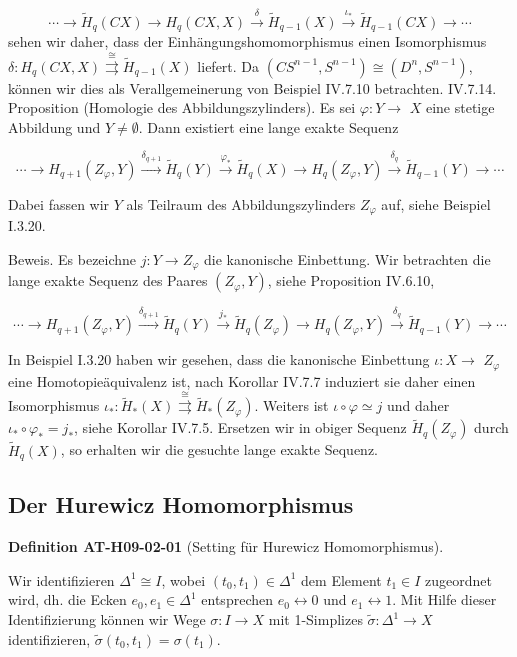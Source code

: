 \documentclass[10pt, letterpaper]{article}
\newcommand{\CustomHeading}[3]{%
  \par\medskip\noindent%
  \textbf{#1 #2} \textnormal{(#3)}.\enskip%
}
\newenvironment{DEF}[2]{\begin{unitbox}\CustomHeading{Definition}{#1}{#2}}{\end{unitbox}}
\begin{document}
$$
\cdots \rightarrow \tilde{H}_q(C X) \rightarrow H_q(C X, X) \xrightarrow{\delta} \tilde{H}_{q-1}(X) \xrightarrow{\iota_*} \tilde{H}_{q-1}(C X) \rightarrow \cdots
$$
sehen wir daher, dass der Einhängungshomomorphismus einen Isomorphismus $\delta: H_q(C X, X) \stackrel{\cong}{\rightrightarrows} \tilde{H}_{q-1}(X)$ liefert. Da $\left(C S^{n-1}, S^{n-1}\right) \cong\left(D^n, S^{n-1}\right)$, können wir dies als Verallgemeinerung von Beispiel IV.7.10 betrachten.
IV.7.14. Proposition (Homologie des Abbildungszylinders). Es sei $\varphi: Y \rightarrow$ $X$ eine stetige Abbildung und $Y \neq \emptyset$. Dann existiert eine lange exakte Sequenz

$$
\cdots \rightarrow H_{q+1}\left(Z_{\varphi}, Y\right) \xrightarrow{\delta_{q+1}} \tilde{H}_q(Y) \xrightarrow{\varphi_*} \tilde{H}_q(X) \rightarrow H_q\left(Z_{\varphi}, Y\right) \xrightarrow{\delta_q} \tilde{H}_{q-1}(Y) \rightarrow \cdots
$$


Dabei fassen wir $Y$ als Teilraum des Abbildungszylinders $Z_{\varphi}$ auf, siehe Beispiel I.3.20.

Beweis. Es bezeichne $j: Y \rightarrow Z_{\varphi}$ die kanonische Einbettung. Wir betrachten die lange exakte Sequenz des Paares $\left(Z_{\varphi}, Y\right)$, siehe Proposition IV.6.10,

$$
\cdots \rightarrow H_{q+1}\left(Z_{\varphi}, Y\right) \xrightarrow{\delta_{q+1}} \tilde{H}_q(Y) \xrightarrow{j_*} \tilde{H}_q\left(Z_{\varphi}\right) \rightarrow H_q\left(Z_{\varphi}, Y\right) \xrightarrow{\delta_q} \tilde{H}_{q-1}(Y) \rightarrow \cdots
$$


In Beispiel I.3.20 haben wir gesehen, dass die kanonische Einbettung $\iota: X \rightarrow$ $Z_{\varphi}$ eine Homotopieäquivalenz ist, nach Korollar IV.7.7 induziert sie daher einen Isomorphismus $\iota_*: \tilde{H}_*(X) \stackrel{\cong}{\rightrightarrows} \tilde{H}_*\left(Z_{\varphi}\right)$. Weiters ist $\iota \circ \varphi \simeq j$ und daher $\iota_* \circ \varphi_*=j_*$, siehe Korollar IV.7.5. Ersetzen wir in obiger Sequenz $\tilde{H}_q\left(Z_{\varphi}\right)$ durch $\tilde{H}_q(X)$, so erhalten wir die gesuchte lange exakte Sequenz.


\pagebreak


\subsection{Der Hurewicz Homomorphismus}


\begin{DEF}{AT-H09-02-01}{Setting für Hurewicz Homomorphismus}
Wir identifizieren $\Delta^1 \cong I$, wobei $\left(t_0, t_1\right) \in \Delta^1$ dem Element $t_1 \in I$ zugeordnet wird, dh. die Ecken $e_0, e_1 \in \Delta^1$ entsprechen $e_0 \leftrightarrow 0$ und $e_1 \leftrightarrow 1$. Mit Hilfe dieser Identifizierung können wir Wege $\sigma: I \rightarrow X$ mit 1-Simplizes $\tilde{\sigma}: \Delta^1 \rightarrow X$ identifizieren, $\tilde{\sigma}\left(t_0, t_1\right)=\sigma\left(t_1\right)$.
\end{DEF}
\end{document}
